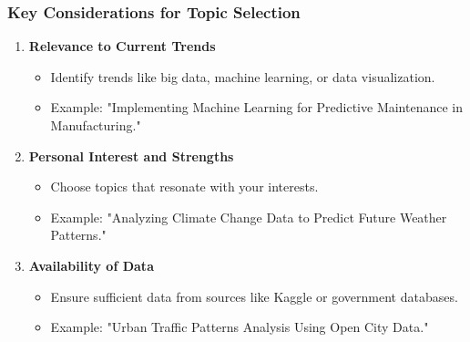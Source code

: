 \documentclass[aspectratio=169]{beamer}
\begin{document}
\begin{frame}[fragile]
    \frametitle{Key Considerations for Topic Selection}
    \begin{enumerate}
        \item \textbf{Relevance to Current Trends}
            \begin{itemize}
                \item Identify trends like big data, machine learning, or data visualization.
                \item Example: "Implementing Machine Learning for Predictive Maintenance in Manufacturing."
            \end{itemize}
        \item \textbf{Personal Interest and Strengths}
            \begin{itemize}
                \item Choose topics that resonate with your interests.
                \item Example: "Analyzing Climate Change Data to Predict Future Weather Patterns."
            \end{itemize}
        \item \textbf{Availability of Data}
            \begin{itemize}
                \item Ensure sufficient data from sources like Kaggle or government databases.
                \item Example: "Urban Traffic Patterns Analysis Using Open City Data."
            \end{itemize}
    \end{enumerate}
\end{frame}
\end{document}
